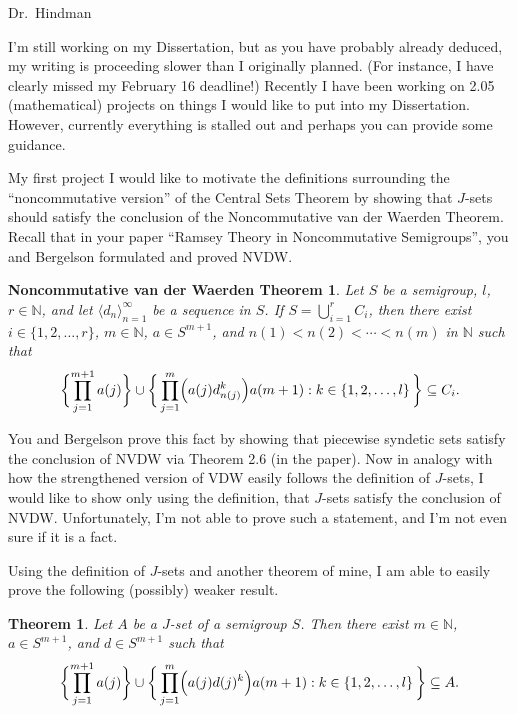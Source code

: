 \documentclass[12pt]{letter}
\date{February 18, 2011}
\theoremstyle{plain}
\newtheorem*{nvdw}{Noncommutative van der Waerden Theorem}
\newtheorem*{thm}{Theorem}
\theoremstyle{definition}
\newcommand{\la}{\langle}
\newcommand{\ra}{\rangle}
\newcommand{\bbN}{\mathbb{N}}
\begin{document}
\begin{letter}{}
\opening{Dr.~Hindman}

I'm still working on my Dissertation, but as you have probably already
deduced, my
writing is proceeding slower than I originally planned.  
(For instance, I have clearly missed my February 16 deadline!)
Recently I have been working on 2.05 (mathematical) projects on things
I would like to put into my Dissertation.
However, currently everything is stalled out and perhaps you can
provide some guidance. 

My first project I would like to motivate the definitions
surrounding the ``noncommutative version'' of the Central Sets Theorem
by showing that $J$-sets should satisfy the conclusion of the
Noncommutative van der Waerden Theorem.  
Recall that in your paper ``Ramsey Theory in Noncommutative
Semigroups'', you and Bergelson formulated and proved NVDW.

\begin{nvdw}
  Let $S$ be a semigroup, $l$, $r \in \bbN$, and let $\la d_n
  \ra_{n=1}^\infty$ be a sequence in $S$. 
  If $S = \bigcup_{i=1}^r C_i$, then there exist $i \in \{1, 2,
  \ldots, r\}$, $m \in \bbN$, $a \in S^{m+1}$, and $n(1) < n(2) <
  \cdots < n(m)$ in $\bbN$ such that 
  \[
    \biggl\{ \prod_{j=1}^{m+1}a(j) \biggr\} \cup \biggl\{\,
    \prod_{j=1}^m\Bigl(a(j)d_{n(j)}^k\Bigr)a(m+1) : k \in \{1, 2, \ldots, l\}
    \,\biggr\} \subseteq C_i.
  \]
\end{nvdw}

You and Bergelson prove this fact by showing that piecewise syndetic
sets satisfy the conclusion of NVDW via Theorem 2.6 (in the paper).
Now in analogy with how the strengthened version of VDW easily follows
the definition of $J$-sets, I would like to show only using the
definition, that $J$-sets satisfy the conclusion of NVDW.
Unfortunately, I'm not able to prove such a statement, and I'm not
even sure if it is a fact.

Using the definition of $J$-sets and another theorem of mine, I am able
to easily prove the following (possibly) weaker result.

\begin{thm}
  Let $A$ be a $J$-set of a semigroup $S$.
  Then there exist $m \in \bbN$, $a \in S^{m+1}$, and $d \in S^{m+1}$
  such that
  \[
    \biggl\{ \prod_{j=1}^{m+1}a(j) \biggr\} \cup \biggl\{\,
    \prod_{j=1}^m\Bigl(a(j)d(j)^k\Bigr)a(m+1) : k \in \{1, 2, \ldots, l\}
    \,\biggr\} \subseteq A.
  \]
\end{thm}


\end{letter}
\end{document}
